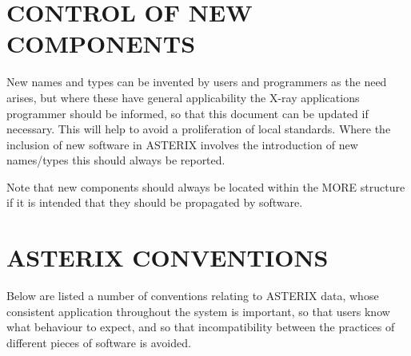 \section{CONTROL OF NEW COMPONENTS}

New names and types can be invented by users and  programmers  as  the
need  arises,  but  where  these  have general applicability the X-ray
applications programmer should be informed, so that this document  can
be  updated  if necessary.  This will help to avoid a proliferation of
local standards.  Where the  inclusion  of  new  software  in  ASTERIX
involves  the  introduction  of  new names/types this should always be
reported.

Note that new components should always  be  located  within  the  MORE
structure  if  it  is  intended  that  they  should  be  propagated by
software.

\section{ASTERIX CONVENTIONS}

Below are listed a number of conventions  relating  to  ASTERIX  data,
whose  consistent  application  throughout the system is important, so
that users know what behaviour to expect, and so that  incompatibility
between the practices of different pieces of software is avoided.

